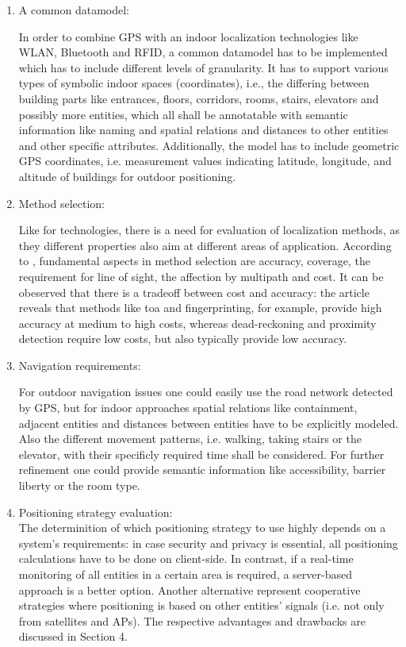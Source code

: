 \begin{enumerate}
	\item A common datamodel:
	
	In order to combine GPS with an indoor localization technologies like WLAN, Bluetooth and RFID, a common datamodel has to be implemented which has to include different levels of granularity.
	It has to support various types of symbolic indoor spaces (coordinates), i.e., the differing between building parts like entrances, floors, corridors, rooms, stairs, elevators and possibly more entities, which all shall be annotatable with semantic information like naming and spatial relations and distances to other entities and other specific attributes. Additionally, the model has to include geometric GPS coordinates, i.e. measurement values indicating latitude, longitude, and altitude of buildings for outdoor positioning.

	\item Method selection:
	
	Like for technologies, there is a need for evaluation of localization methods, as they different properties also aim at different areas of application. 
	According to \cite{recentAdvances}, fundamental aspects in method selection are accuracy, coverage, the requirement for line of sight, the affection by multipath and cost.
	It can be obeserved that there is a tradeoff between cost and accuracy: the article reveals that methods like \ac{toa} and fingerprinting, for example, provide high accuracy at medium to high costs, whereas dead-reckoning and proximity detection require low costs, but also typically provide low accuracy.

	\item Navigation requirements:
	
	For outdoor navigation issues one could easily use the road network detected by GPS, but for indoor approaches spatial relations like containment, adjacent entities and distances between entities have to be explicitly modeled. Also the different movement patterns, i.e. walking, taking stairs or the elevator, with their specificly required time shall be considered. For further refinement one could provide semantic information like accessibility, barrier liberty or the room type.

	\item Positioning strategy evaluation:\\
	The determinition of which positioning strategy to use highly depends on a system's requirements: in case security and privacy is essential, all positioning calculations have to be done on client-side. In contrast, if a real-time monitoring of all entities in a certain area is required, a server-based approach is a better option.
	Another alternative represent cooperative strategies where positioning is based on other entities' signals (i.e. not only from satellites and APs). The respective advantages and drawbacks are discussed in Section 4.
\end{enumerate}
		
